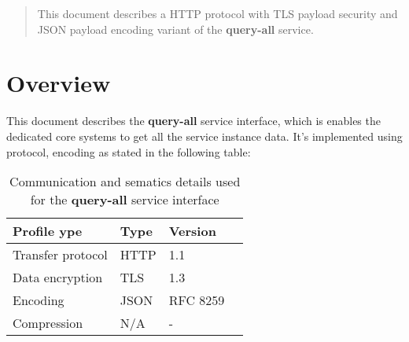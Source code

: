 \documentclass[a4paper]{arrowhead}
\begin{document}
\ArrowheadDate{\today}
\ArrowheadSetup

\begin{center}
  \vspace*{1cm}
  \huge{\arrowtitle}

  \vspace*{0.2cm}
  \LARGE{\arrowtype}
  \vspace*{1cm}
\end{center}

  \vspace*{\fill}


  \vspace*{1cm}
  \vspace*{\fill}

  \begin{abstract}
    This document describes a HTTP protocol with TLS payload
    security and JSON payload encoding variant of the \textbf{query-all} service.
  \end{abstract}
  \vspace*{1cm}

\newpage

\tableofcontents
\newpage

\section{Overview}
\label{sec:overview}

This document describes the \textbf{query-all} service interface,
which is enables the dedicated core systems to get all the service instance data. It's implemented using protocol, encoding as stated in the following table:

\begin{table}[ht!]
  \centering
  \begin{tabular}{|l|l|l|l|}
    \rowcolor{gray!33} Profile ype & Type & Version \\ \hline
    Transfer protocol & HTTP & 1.1 \\ \hline
    Data encryption & TLS & 1.3 \\ \hline
    Encoding & JSON & RFC 8259 \cite{rfc8259} \\ \hline
    Compression & N/A & - \\ \hline
  \end{tabular}
  \caption{Communication and sematics details used for the \textbf{query-all}
    service interface}
  \label{tab:comunication_semantics_profile}
\end{table}
\end{document}
